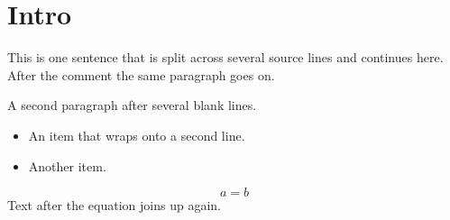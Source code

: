 \documentclass{article}
\begin{document}
\section{Intro}
This is one sentence that
is split across several
source lines %
and continues here.
After the comment the same paragraph goes on.



A second paragraph after
several blank lines.
\begin{itemize}
\item An item that wraps
onto a second line.
\item Another item.
\end{itemize}
\begin{equation}
a = b
\end{equation}
Text after the equation
joins up again.
\end{document}
